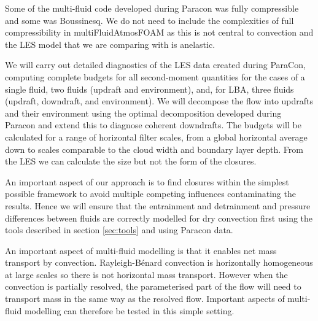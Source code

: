 \documentclass[11pt,a4paper]{article}
\begin{document}
Some of the multi-fluid code developed during Paracon was fully compressible and some was Boussinesq. We do not need to include the complexities of full compressibility in multiFluidAtmosFOAM as this is not central to convection and the LES model that we are comparing with is anelastic. 


We will carry out detailed diagnostics of the LES data created during ParaCon, computing complete budgets for all second-moment quantities for the cases of a single fluid, two fluids (updraft and environment), and, for LBA, three fluids (updraft, downdraft, and environment).
We will decompose the flow into updrafts and their environment using the optimal decomposition developed during Paracon and extend this to diagnose coherent downdrafts. The budgets will be calculated for a range of horizontal filter scales, from a global horizontal average down to scales comparable to the cloud width and boundary layer depth. From the LES we can calculate the size but not the form of the closures.


An important aspect of our approach is to find closures within the simplest possible framework to avoid multiple competing influences contaminating the results. Hence we will ensure that the entrainment and detrainment and pressure differences between fluids are correctly modelled for dry convection first using the tools described in section \ref{sec:tools} and using Paracon data.

An important aspect of multi-fluid modelling is that it enables net mass transport by convection. Rayleigh-B\'enard convection is horizontally homogeneous at large  scales so there is not horizontal mass transport. However when the convection is partially resolved, the parameterised part of the flow will need to transport mass in the same way as the resolved flow. Important aspects of multi-fluid modelling can therefore be tested in this simple setting.

\end{document}

